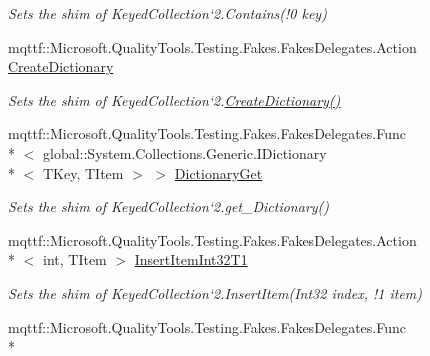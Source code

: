 \begin{DoxyCompactItemize}
\begin{DoxyCompactList}\small\item\em Sets the shim of Keyed\-Collection`2.Contains(!0 key)\end{DoxyCompactList}\item 
mqttf\-::\-Microsoft.\-Quality\-Tools.\-Testing.\-Fakes.\-Fakes\-Delegates.\-Action \hyperlink{class_system_1_1_collections_1_1_object_model_1_1_fakes_1_1_shim_keyed_collection_3_01_t_key_00_01_t_item_01_4_a910d6c888fea98902c9139829d854d91}{Create\-Dictionary}
\begin{DoxyCompactList}\small\item\em Sets the shim of Keyed\-Collection`2.\hyperlink{class_system_1_1_collections_1_1_object_model_1_1_fakes_1_1_shim_keyed_collection_3_01_t_key_00_01_t_item_01_4_a910d6c888fea98902c9139829d854d91}{Create\-Dictionary()}\end{DoxyCompactList}\item 
mqttf\-::\-Microsoft.\-Quality\-Tools.\-Testing.\-Fakes.\-Fakes\-Delegates.\-Func\\*
$<$ global\-::\-System.\-Collections.\-Generic.\-I\-Dictionary\\*
$<$ T\-Key, T\-Item $>$ $>$ \hyperlink{class_system_1_1_collections_1_1_object_model_1_1_fakes_1_1_shim_keyed_collection_3_01_t_key_00_01_t_item_01_4_a4b4b08bf283cac7f10bd99bfa044bef8}{Dictionary\-Get}
\begin{DoxyCompactList}\small\item\em Sets the shim of Keyed\-Collection`2.get\-\_\-\-Dictionary()\end{DoxyCompactList}\item 
mqttf\-::\-Microsoft.\-Quality\-Tools.\-Testing.\-Fakes.\-Fakes\-Delegates.\-Action\\*
$<$ int, T\-Item $>$ \hyperlink{class_system_1_1_collections_1_1_object_model_1_1_fakes_1_1_shim_keyed_collection_3_01_t_key_00_01_t_item_01_4_ae13b9212752fcd3a4a173422413776d7}{Insert\-Item\-Int32\-T1}
\begin{DoxyCompactList}\small\item\em Sets the shim of Keyed\-Collection`2.Insert\-Item(Int32 index, !1 item)\end{DoxyCompactList}\item 
mqttf\-::\-Microsoft.\-Quality\-Tools.\-Testing.\-Fakes.\-Fakes\-Delegates.\-Func\\*

\end{DoxyCompactItemize}
